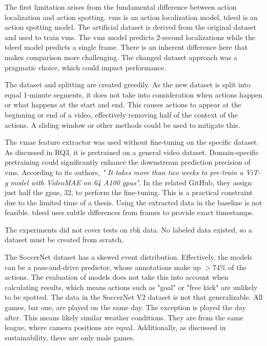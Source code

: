 The first limitation arises from the fundamental difference between action localization and action spotting. \acrshort{vms} is an action localization model, \acrshort{tdeed} is an action spotting model. The artificial dataset is derived from the original dataset and used to train \acrshort{vms}. The \acrshort{vms} model predicts 2-second localizations while the \acrshort{tdeed} model predicts a single frame. There is an inherent difference here that makes comparison more challenging. The changed dataset approach was a pragmatic choice, which could impact performance. 

The dataset and splitting are created greedily. As the new dataset is split into equal 1-minute segments, it does not take into consideration when actions happen or what happens at the start and end. This causes actions to appear at the beginning or end of a video, effectively removing half of the context of the actions. A sliding window or other methods could be used to mitigate this. 

The \acrshort{vmae} feature extractor was used without fine-tuning on the specific dataset. As discussed in RQ3, it is pretrained on a general video dataset. Domain-specific pretraining could significantly enhance the downstream prediction precision of \acrshort{vms}. According to its authors, \textit{" It takes more than two weeks to pre-train a ViT-g model with VideoMAE on 64 A100 \acrshort{gpu}s"}\cite{wang_videomae_2023}. In the related GitHub, they assign just half the \acrshort{gpu}s, 32, to perform the fine-tuning. This is a practical constraint due to the limited time of a thesis. Using the extracted data in the baseline is not feasible. \acrshort{tdeed} uses subtle differences from frames to provide exact timestamps. 

The experiments did not cover tests on \acrfull{rbk} data. No labeled data existed, so a dataset must be created from scratch. 

The SoccerNet dataset has a skewed event distribution. Effectively, the models can be a pass-and-drive predictor, whose annotations make up $>74\%$ of the actions. The evaluation of models does not take this into account when calculating results, which means actions such as "goal" or "free kick" are unlikely to be spotted. The data in the SoccerNet V2 dataset is not that generalizable. All games, bar one, are played on the same day. The exception is played the day after. This means likely similar weather conditions. They are from the same league, where camera positions are equal. Additionally, as discussed in sustainability, there are only male games. 

